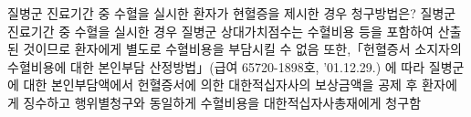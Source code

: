 \prezi{\clearpage}
\begin{commentbox}{질병군 진료기간 중 수혈을 실시한 환자가 현혈증을 제시한 경우 청구방법은?}
질병군 진료기간 중 수혈을 실시한 경우 질병군 상대가치점수는 수혈비용 등을 포함하여 산출된 것이므로 환자에게 별도로 수혈비용을 부담시킬 수 없음
또한,「헌혈증서 소지자의 수혈비용에 대한 본인부담 산정방법」(급여 65720-1898호, '01.12.29.) 에 따라 질병군에 대한 본인부담액에서 헌혈증서에 의한 대한적십자사의 보상금액을 공제 후 환자에게 징수하고 행위별청구와 동일하게 수혈비용을 대한적십자사총재에게 청구함
\end{commentbox}